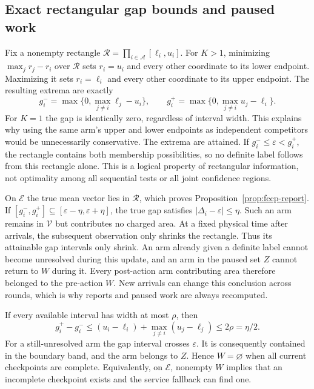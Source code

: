 \documentclass[11pt]{article}
\theoremstyle{remark}
\begin{document}
\subsection{Exact rectangular gap bounds and paused work}
Fix a nonempty rectangle
$\mathcal R=\prod_{i\in\mathcal A}[\ell_i,u_i]$.
For $K>1$, minimizing $\max_jr_j-r_i$ over $\mathcal R$ sets
$r_i=u_i$ and every other coordinate to its lower endpoint. Maximizing
it sets $r_i=\ell_i$ and every other coordinate to its upper endpoint.
The resulting extrema are exactly
\[
 g_i^-=\max\{0,\max_{j\ne i}\ell_j-u_i\},\qquad
 g_i^+=\max\{0,\max_{j\ne i}u_j-\ell_i\}.
\]
For $K=1$ the gap is identically zero, regardless of interval width.
This explains why using the same arm's upper and lower endpoints as
independent competitors would be unnecessarily conservative.
The extrema are attained. If
$g_i^-\le\varepsilon<g_i^+$, the rectangle contains both membership
possibilities, so no definite label follows from this rectangle alone.
This is a logical property of rectangular information, not optimality
among all sequential tests or all joint confidence regions.

On $\mathcal E$ the true mean vector lies in $\mathcal R$, which proves
Proposition~\ref{prop:fccp-report}. If
$[g_i^-,g_i^+]\subseteq[\varepsilon-\eta,\varepsilon+\eta]$, the true
gap satisfies $|\Delta_i-\varepsilon|\le\eta$. Such an arm remains in
$\mathcal V$ but contributes no charged area. At a fixed physical time
after arrivals, the subsequent observation only shrinks the rectangle.
Thus its attainable gap intervals only shrink. An arm already given a
definite label cannot become unresolved during this update, and an arm
in the paused set $Z$ cannot return to $W$ during it. Every post-action
arm contributing area therefore belonged to the pre-action $W$.
New arrivals can change this conclusion across rounds, which is why
reports and paused work are always recomputed.

If every available interval has width at most $\rho$, then
\[
 g_i^+-g_i^-\le(u_i-\ell_i)+
                  \max_{j\ne i}(u_j-\ell_j)\le2\rho=\eta/2.
\]
For a still-unresolved arm the gap interval crosses $\varepsilon$.
It is consequently contained in the boundary band, and the arm belongs
to $Z$. Hence $W=\varnothing$ when all current checkpoints are complete.
Equivalently, on $\mathcal E$, nonempty $W$ implies that an incomplete
checkpoint exists and the service fallback can find one.
\end{document}

